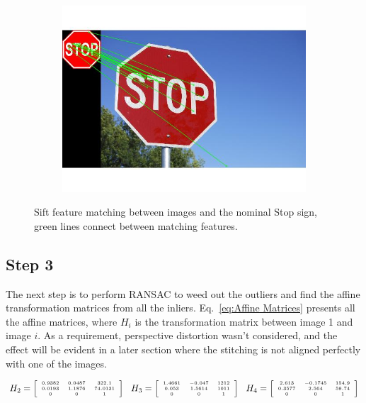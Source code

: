 \documentclass[a4paper]{iacas}
\begin{document}
\begin{figure}[!htbp]
\begin{subfigure}[b]{0.32\textwidth}
		\includegraphics[width=\textwidth]{204.jpg}
		\caption{}
		\label{fig:204}
	\end{subfigure}
	
	\caption{Sift feature matching between images and the nominal Stop sign, green lines connect between matching features.}
	\label{fig:200}
\end{figure}

\subsection{Step 3}

The next step is to perform RANSAC to weed out the outliers and find the affine transformation matrices from all the inliers. Eq.~\ref{eq:Affine Matrices} presents all the affine matrices, where $H_i$ is the transformation matrix between image 1 and image $i$. As a requirement, perspective distortion wasn't considered, and the effect will be evident in a later section where the stitching is not aligned perfectly with one of the images.

\begin{equation}
\tiny
H_2 = \left[
\begin{array}{ccc}
0.9382 & 0.0487 & 322.1 \\
0.0193 & 1.1876 & 74.0131 \\
0 & 0 & 1
\end{array}
\right]
\quad H_3 = \left[
\begin{array}{ccc}
1.4661 & -0.047 & 1212 \\
0.053 & 1.5614 & 1011 \\
0 & 0 & 1
\end{array}
\right]
\quad H_4 = \left[
\begin{array}{ccc}
2.613 & -0.1745 & 154.9 \\
0.3577 & 2.564 & 59.74 \\
0 & 0 & 1
\end{array}
\right]
\end{equation}\label{eq:Affine Matrices}
\end{document}
